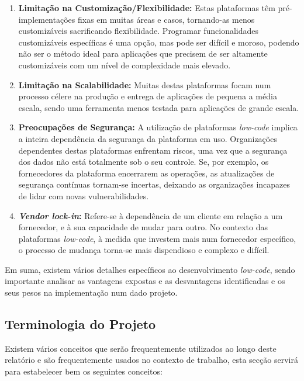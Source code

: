             \begin{enumerate}
                \item \textbf{Limitação na Customização/Flexibilidade:}  Estas plataformas têm pré-implementações fixas em muitas áreas e casos, tornando-as menos customizáveis sacrificando flexibilidade. Programar funcionalidades customizáveis específicas é uma opção, mas pode ser difícil e moroso, podendo não ser o método ideal para aplicações que precisem de ser altamente customizáveis com um nível de complexidade mais elevado.
            
                \item \textbf{Limitação na Scalabilidade:} Muitas destas plataformas focam num processo célere na produção e entrega de aplicações de pequena a média escala, sendo uma ferramenta menos testada para aplicações de grande escala.
            
                \item \textbf{Preocupações de Segurança:} A utilização de plataformas \textit{low-code} implica a inteira dependência da segurança da plataforma em uso. Organizações dependentes destas plataformas enfrentam riscos, uma vez que a segurança dos dados não está totalmente sob o seu controle. Se, por exemplo, os fornecedores da plataforma encerrarem as operações, as atualizações de segurança contínuas tornam-se incertas, deixando as organizações incapazes de lidar com novas vulnerabilidades.

                \item \textbf{\textit{Vendor lock-in}:} Refere-se à dependência de um cliente em relação a um fornecedor, e à sua capacidade de mudar para outro. No contexto das plataformas \textit{low-code}, à medida que investem mais num fornecedor específico, o processo de mudança torna-se mais dispendioso e complexo e difícil\cite{yan2021impacts}.
            \end{enumerate} 

            Em suma, existem vários detalhes específicos ao desenvolvimento \textit{low-code}, sendo importante analisar as vantagens expostas e as desvantagens identificadas e os seus pesos na implementação num dado projeto.

    \subsection{Terminologia do Projeto}\label{sec:terminologia_do_projeto}
        
        Existem vários conceitos que serão frequentemente utilizados ao longo deste relatório e são frequentemente usados no contexto de trabalho, esta secção servirá para estabelecer bem os seguintes conceitos:

